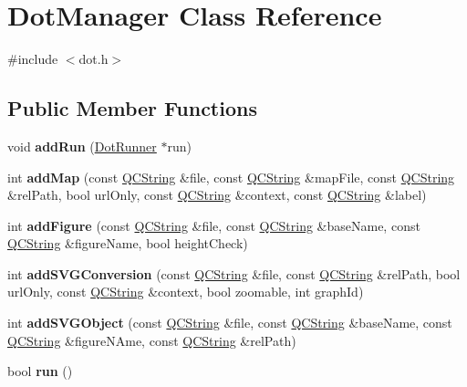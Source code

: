 \hypertarget{class_dot_manager}{}\section{Dot\+Manager Class Reference}
\label{class_dot_manager}


{\ttfamily \#include $<$dot.\+h$>$}

\subsection*{Public Member Functions}
\begin{DoxyCompactItemize}
\item 
\mbox{\label{class_dot_manager_a738dc3b3bdbcc60b802db0ccd43c6f84}} 
void {\bfseries add\+Run} (\mbox{\hyperlink{class_dot_runner}{Dot\+Runner}} $\ast$run)
\item 
\mbox{\label{class_dot_manager_a00e00b1956a2b2b6477d9af428c300c2}} 
int {\bfseries add\+Map} (const \mbox{\hyperlink{class_q_c_string}{Q\+C\+String}} \&file, const \mbox{\hyperlink{class_q_c_string}{Q\+C\+String}} \&map\+File, const \mbox{\hyperlink{class_q_c_string}{Q\+C\+String}} \&rel\+Path, bool url\+Only, const \mbox{\hyperlink{class_q_c_string}{Q\+C\+String}} \&context, const \mbox{\hyperlink{class_q_c_string}{Q\+C\+String}} \&label)
\item 
\mbox{\label{class_dot_manager_af84ce8e355f7971a4a8869993d7d0181}} 
int {\bfseries add\+Figure} (const \mbox{\hyperlink{class_q_c_string}{Q\+C\+String}} \&file, const \mbox{\hyperlink{class_q_c_string}{Q\+C\+String}} \&base\+Name, const \mbox{\hyperlink{class_q_c_string}{Q\+C\+String}} \&figure\+Name, bool height\+Check)
\item 
\mbox{\label{class_dot_manager_adf754e666617a77c8aed10ccc90a3860}} 
int {\bfseries add\+S\+V\+G\+Conversion} (const \mbox{\hyperlink{class_q_c_string}{Q\+C\+String}} \&file, const \mbox{\hyperlink{class_q_c_string}{Q\+C\+String}} \&rel\+Path, bool url\+Only, const \mbox{\hyperlink{class_q_c_string}{Q\+C\+String}} \&context, bool zoomable, int graph\+Id)
\item 
\mbox{\label{class_dot_manager_a68003377d30caae4e674bd3b4b8f2899}} 
int {\bfseries add\+S\+V\+G\+Object} (const \mbox{\hyperlink{class_q_c_string}{Q\+C\+String}} \&file, const \mbox{\hyperlink{class_q_c_string}{Q\+C\+String}} \&base\+Name, const \mbox{\hyperlink{class_q_c_string}{Q\+C\+String}} \&figure\+N\+Ame, const \mbox{\hyperlink{class_q_c_string}{Q\+C\+String}} \&rel\+Path)
\item 
\mbox{\label{class_dot_manager_a3b34d4c3e0ab9e9debe6c7fa45a129bb}} 
bool {\bfseries run} ()
\end{DoxyCompactItemize}
